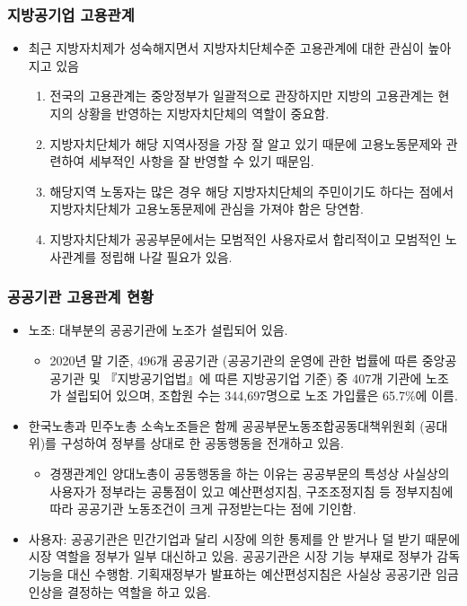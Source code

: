 \documentclass[aspectratio=169,xcolor=dvipsnames,handout]{beamer}
\begin{document}
\begin{frame}[allowframebreaks]
    \frametitle{지방공기업 고용관계}
    \begin{itemize}[<+->]
        \item 최근 지방자치제가 성숙해지면서 지방자치단체수준 고용관계에 대한 관심이 높아지고 있음
        \begin{enumerate}[<+->]
            \item  전국의 고용관계는 중앙정부가 일괄적으로 관장하지만 지방의 고용관계는 현지의 상황을 반영하는 지방자치단체의 역할이 중요함.
            \item  지방자치단체가 해당 지역사정을 가장 잘 알고 있기 때문에 고용노동문제와 관련하여 세부적인 사항을 잘 반영할 수 있기 때문임.
            \item  해당지역 노동자는 많은 경우 해당 지방자치단체의 주민이기도 하다는 점에서 지방자치단체가 고용노동문제에 관심을 가져야 함은 당연함.
            \item 지방자치단체가 공공부문에서는 모범적인 사용자로서 합리적이고 모범적인 노사관계를 정립해 나갈 필요가 있음.
        \end{enumerate}
    \end{itemize}
\end{frame}

\begin{frame}[allowframebreaks]
    \frametitle{공공기관 고용관계 현황}
    \begin{itemize}[<+->]
        \item 노조: 대부분의 공공기관에 노조가 설립되어 있음. 
        \begin{itemize}
               \item 2020년 말 기준, 496개 공공기관 (공공기관의 운영에 관한 법률에 따른 중앙공공기관 및 『지방공기업법』에 따른 지방공기업 기준) 중 407개 기관에 노조가 설립되어 있으며, 조합원 수는 344,697명으로 노조 가입률은 65.7\%에 이름.
        \end{itemize}
        \item 한국노총과 민주노총 소속노조들은 함께 공공부문노동조합공동대책위원회 (공대위)를 구성하여 정부를 상대로 한 공동행동을 전개하고 있음. 
        \begin{itemize}
               \item 경쟁관계인 양대노총이 공동행동을 하는 이유는 공공부문의 특성상 사실상의 사용자가 정부라는 공통점이 있고 예산편성지침, 구조조정지침 등 정부지침에 따라 공공기관 노동조건이 크게 규정받는다는 점에 기인함.
        \end{itemize}
        \item 사용자: 공공기관은 민간기업과 달리 시장에 의한 통제를 안 받거나 덜 받기 때문에 시장 역할을 정부가 일부 대신하고 있음. 공공기관은 시장 기능 부재로 정부가 감독 기능을 대신 수행함.  기획재정부가 발표하는 예산편성지침은 사실상 공공기관 임금인상을 결정하는 역할을 하고 있음.
    \end{itemize}
\end{frame}
\end{document}

